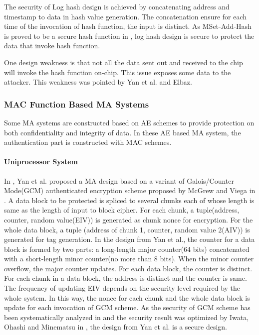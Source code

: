 \documentclass{article}
\begin{document}
The security of Log hash design is achieved by concatenating address and timestamp to data in hash value generation. The concatenation ensure for each time of the invocation of hash function, the input is distinct.
As MSet-Add-Hash is proved to be a secure hash function in \cite{Clarke-hash}, log hash design is secure to protect the data that invoke hash function.

One design weakness is that not all the data sent out and received to the chip will invoke the hash function on-chip. This issue exposes some data to the attacker. This weakness was pointed by Yan et al.\cite{yan-MA} and Elbaz\cite{area}. 

\subsubsection{MAC Function Based MA Systems}
Some MA systems are constructed based on AE schemes to provide protection on both confidentiality and integrity of data. In these AE based MA system, the authentication part is constructed with MAC schemes.
\paragraph{Uniprocessor System}
In \cite{yan-MA}, Yan et al. proposed a MA design based on a variant of Galois/Counter Mode(GCM) authenticated encryption scheme proposed by McGrew and Viega in \cite{gcm}. A data block to be protected is spliced to several chunks each of whose length is same as the length of input to block cipher. For each chunk, a tuple(address, counter, random value(EIV)) is generated as chunk nonce for encryption. For the whole data block, a tuple (address of chunk 1, counter, random value 2(AIV)) is generated for tag generation. 
In the design from Yan et al., the counter for a data block is formed by two parts: a long-length major counter(64 bits) concatenated with a short-length minor counter(no more than 8 bits). When the minor counter overflow, the major counter updates. For each data block, the counter is distinct. For each chunk in a data block, the address is distinct and the counter is same. The frequency of updating EIV depends on the security level required by the whole system.  In this way, the nonce for each chunk and the whole data block is update for each invocation of GCM scheme. As the security of GCM scheme has been systematically analyzed in \cite{gcm} and the security result was optimized by Iwata, Ohashi and Minematsu in \cite{breaking}, the design from Yan et al. is a secure design.
\end{document}
